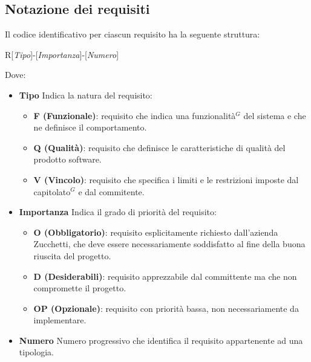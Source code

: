 \documentclass[a4paper,10pt]{article}
\def\\{ }%
\def\\{ }%
\def\\{ }%
\begin{document}
    \subsection{Notazione dei requisiti}
    Il codice identificativo per ciascun requisito ha la seguente struttura:
    \begin{center}
        R[\textit{Tipo}]-[\textit{Importanza}]-[\textit{Numero}]
    \end{center} 
    Dove: 
    \begin{itemize}
        \item \textbf{Tipo} \\
            Indica la natura del requisito:
            \begin{itemize}
                \item \textbf{F (Funzionale)}: requisito che indica una funzionalità$^G$ del sistema e che ne definisce il comportamento.
                \item \textbf{Q (Qualità)}: requisito che definisce le caratteristiche di qualità del prodotto software.
                \item \textbf{V (Vincolo)}: requisito che specifica i limiti e le restrizioni imposte dal capitolato$^G$ e dal commitente. 
            \end{itemize}
        \item \textbf{Importanza} \\
            Indica il grado di priorità del requisito:
            \begin{itemize}
                \item \textbf{O (Obbligatorio)}: requisito esplicitamente richiesto dall'azienda Zucchetti, che deve essere necessariamente soddisfatto al fine della buona riuscita del progetto.
                \item \textbf{D (Desiderabili)}: requisito apprezzabile dal committente ma che non compromette il progetto.
                \item \textbf{OP (Opzionale)}: requisito con priorità bassa, non necessariamente da implementare.
            \end{itemize}
        \item \textbf{Numero}\\
            Numero progressivo che identifica il requisito appartenente ad una tipologia. 
    \end{itemize}

\end{document}
